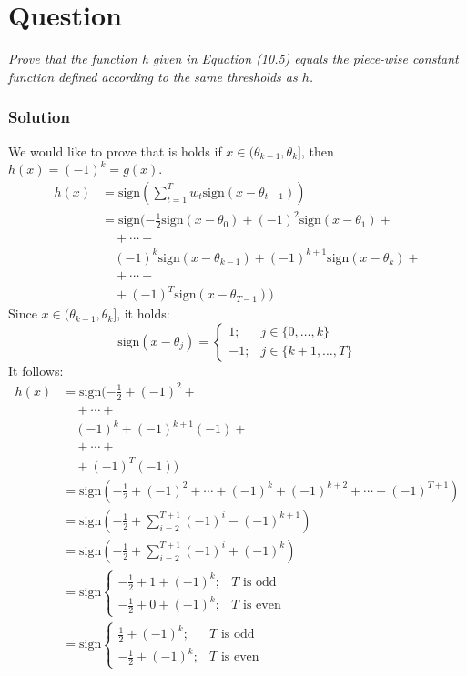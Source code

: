 \documentclass{article}
\newcommand{\sign}{\text{sign}}
\newcounter{counterquestion}
\newenvironment{question}[1]
{
\stepcounter{counterquestion}
\section*{Question \thecounterquestion}
\emph{#1} 
} 
{
}
\newenvironment{solution}
{
\subsubsection*{Solution}
} 
{
}
\begin{document}
\begin{question}{Prove that the function h given in Equation (10.5) equals the piece-wise constant function defined according to the same thresholds as $h$.}
\begin{solution}
We would like to prove that is holds if $x \in (\theta_{k -1}, \theta_k]$, then $h(x) = (-1)^k = g(x)$.
\begin{align*}
h(x) & = \sign \left( \sum_{t = 1}^{T} w_t \sign(x - \theta_{t - 1}) \right) \\
& = \sign ( -\frac{1}{2} \sign(x - \theta_0) + (-1)^2 \sign(x - \theta_1) + \\
& \quad + \cdots + \\
& \quad (-1)^k \sign(x - \theta_{k-1}) + (-1)^{k + 1} \sign(x - \theta_k) + \\
& \quad + \cdots + \\
& \quad + (-1)^T \sign(x - \theta_{T-1}) )
\end{align*}
Since $x \in (\theta_{k -1}, \theta_k]$, it holds:
\[
\sign(x - \theta_j) =
\begin{cases}
1; & j \in \{ 0, \dots, k \} \\
- 1; & j \in \{ k + 1, \dots, T \}
\end{cases}
\]
It follows:
\begin{align*}
h(x) & = \sign ( -\frac{1}{2} + (-1)^2 + \\
& \quad + \cdots + \\
& \quad (-1)^k + (-1)^{k + 1} (-1) + \\
& \quad + \cdots + \\
& \quad + (-1)^T (-1) ) \\
& = \sign \left( -\frac{1}{2} + (-1)^2 + \cdots + (-1)^k + (-1)^{k + 2} + \cdots + (-1)^{T + 1} \right) \\
& = \sign \left( -\frac{1}{2} + \sum_{i = 2}^{T + 1} (-1)^i - (-1)^{k + 1} \right) \\
& = \sign \left( -\frac{1}{2} + \sum_{i = 2}^{T + 1} (-1)^i + (-1)^{k} \right) \\
& = \sign
\begin{cases}
-\frac{1}{2} + 1 + (-1)^{k}; & T \text{ is odd} \\
-\frac{1}{2} + 0 + (-1)^{k}; & T \text{ is even}
\end{cases} \\
& = \sign
\begin{cases}
\frac{1}{2} + (-1)^{k}; & T \text{ is odd} \\
- \frac{1}{2} + (-1)^{k}; & T \text{ is even}

\end{cases}
\end{align*}
\end{solution}
\end{question}
\end{document}
